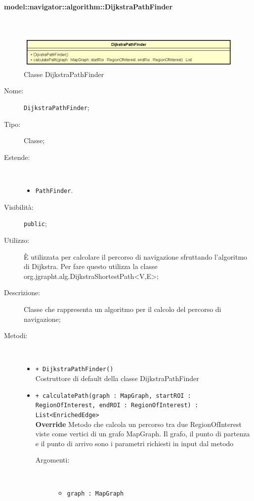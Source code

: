 \documentclass[../DefinizioneDiProdotto.tex]{subfiles}
\begin{document}
\paragraph{model::navigator::algorithm::DijkstraPathFinder}
\
\begin{figure}[H]
	\centering
	\includegraphics[width=\maxwidth]{img/DijkstraPathFinder.png}
	\caption{Classe DijkstraPathFinder}\label{fig:model::navigator::algorithm::DijkstraPathFinder} 
\end{figure}
\begin{description}
	\item[Nome:] \texttt{DijkstraPathFinder};
	\item[Tipo:] Classe;
	\item[Estende:] \
	\begin{itemize}
		\item \texttt{PathFinder}.
	\end{itemize}
	\item[Visibilità:] \texttt{public};
	\item[Utilizzo:] È utilizzata per calcolare il percorso di navigazione sfruttando l'algoritmo di Dijkstra. Per fare questo utilizza la classe org.jgrapht.alg.\-DijkstraShortestPath<V,E>;
	\item[Descrizione:] Classe che rappresenta un algoritmo per il calcolo del percorso di navigazione;
	\item[Metodi:] \
	\begin{itemize}
		\item \texttt{+ DijkstraPathFinder()}\\
		Costruttore di default della classe DijkstraPathFinder
		\item \texttt{+ calculatePath(graph : MapGraph, startROI : RegionOfInterest, endROI : RegionOfInterest) : List<EnrichedEdge>}\\
		\textbf{Override} Metodo che calcola un percorso tra due RegionOfInterest viste come vertici di un grafo MapGraph. Il grafo, il punto di partenza e il punto di arrivo sono i parametri richiesti in input dal metodo
		\begin{description}
			\item[Argomenti:] \
			\begin{itemize}
				\item \texttt{graph : MapGraph}\\

\end{itemize}
\end{description}
\end{itemize}
\end{description}
\end{document}
